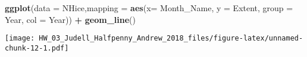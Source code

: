\documentclass[]{article}
\newenvironment{Shaded}{\begin{snugshade}}{\end{snugshade}}
\newcommand{\KeywordTok}[1]{\textcolor[rgb]{0.13,0.29,0.53}{\textbf{#1}}}
\newcommand{\DataTypeTok}[1]{\textcolor[rgb]{0.13,0.29,0.53}{#1}}
\newcommand{\StringTok}[1]{\textcolor[rgb]{0.31,0.60,0.02}{#1}}
\newcommand{\OperatorTok}[1]{\textcolor[rgb]{0.81,0.36,0.00}{\textbf{#1}}}
\newcommand{\NormalTok}[1]{#1}
\begin{document}
\begin{Shaded}
\begin{Highlighting}[]
\KeywordTok{ggplot}\NormalTok{(}\DataTypeTok{data =}\NormalTok{ NHice,}\DataTypeTok{mapping =} \KeywordTok{aes}\NormalTok{(}\DataTypeTok{x=}\NormalTok{ Month_Name, }\DataTypeTok{y =}\NormalTok{ Extent, }\DataTypeTok{group =}\NormalTok{ Year, }\DataTypeTok{col =}\NormalTok{ Year)) }\OperatorTok{+}\StringTok{ }\KeywordTok{geom_line}\NormalTok{()}
\end{Highlighting}
\end{Shaded}

\texttt{[image: HW\_03\_Judell\_Halfpenny\_Andrew\_2018\_files/figure-latex/unnamed-chunk-12-1.pdf]}
\end{document}
